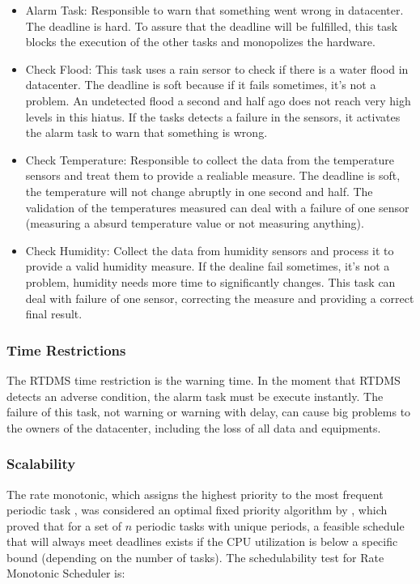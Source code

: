\documentclass[12pt]{article}
\begin{document}
\begin{itemize}
 \item Alarm Task: Responsible to warn that something went wrong in datacenter. The deadline is hard. To assure
 that the deadline will be fulfilled, this task blocks the execution of the other tasks and monopolizes the hardware.
 \item Check Flood: This task uses a rain sersor to check if there is a water flood in datacenter. The deadline is
 soft because if it fails sometimes, it's not a problem. An undetected flood a second and half ago does not reach
 very high levels in this hiatus. If the tasks detects a failure in the sensors, it activates the alarm task to warn
 that something is wrong.
 \item Check Temperature: Responsible to collect the data from the temperature sensors and treat them to provide
 a realiable measure. The deadline is soft, the temperature will not change abruptly in one second and half. The
 validation of the temperatures measured can deal with a failure of one sensor (measuring a absurd temperature value
 or not measuring anything).
 \item Check Humidity: Collect the data from humidity sensors and process it to provide a valid humidity measure. If the
 dealine fail sometimes, it's not a problem, humidity needs more time to significantly changes. This task can deal with 
 failure of one sensor, correcting the measure and providing a correct final result.
\end{itemize}

\subsubsection{Time Restrictions}

The RTDMS time restriction is the warning time. In the moment that RTDMS detects an adverse condition,
the alarm task must be execute instantly. The failure of this task, not warning or warning with delay,
can cause big problems to the owners of the datacenter, including the loss of all data and equipments.

\subsubsection{Scalability}

The rate monotonic, which assigns the highest priority to the most frequent periodic task \cite{stankovic1996real}, 
was considered an optimal fixed priority algorithm by \cite{liu1973scheduling}, which proved that for 
a set of \(n\) periodic tasks with unique periods, a feasible schedule that will always meet deadlines 
exists if the CPU utilization is below a specific bound (depending on the number of tasks). The schedulability 
test for Rate Monotonic Scheduler is:
\end{document}
